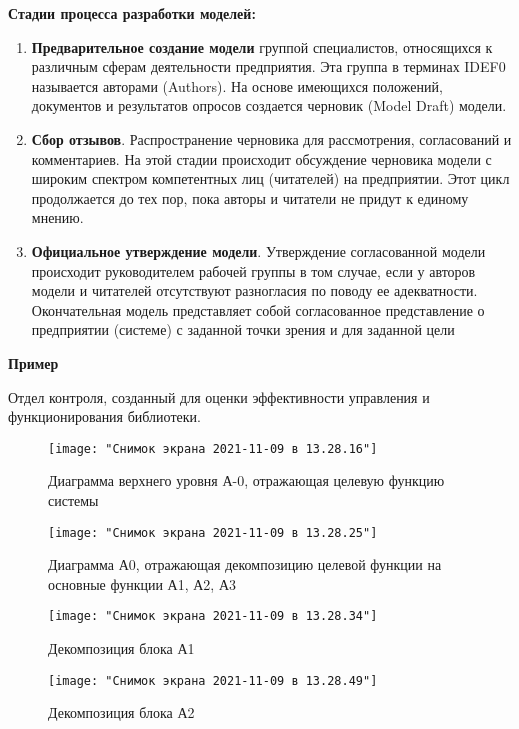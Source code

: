 \documentclass[a4paper]{article}
\begin{document}
	\textbf{Стадии процесса разработки моделей:}
	\begin{enumerate}
		\item \textbf{Предварительное создание модели} группой специалистов, относящихся к различным сферам деятельности предприятия. Эта группа в терминах IDEF0 называется авторами (Authors). На основе имеющихся положений, документов и результатов опросов создается черновик (Model Draft) модели. 
		\item \textbf{Сбор отзывов}. Распространение черновика для рассмотрения, согласований и комментариев. На этой стадии происходит обсуждение черновика модели с широким спектром компетентных лиц (читателей) на предприятии. Этот цикл продолжается до тех пор, пока авторы и читатели не придут к единому мнению.
		\item \textbf{Официальное утверждение модели}. Утверждение согласованной модели происходит руководителем рабочей группы в том случае, если у авторов модели и читателей отсутствуют разногласия по поводу ее адекватности. Окончательная модель представляет собой согласованное представление о предприятии (системе) с заданной точки зрения и для заданной цели
	\end{enumerate}

	\textbf{Пример}
	
	Отдел контроля, созданный для оценки эффективности управления и функционирования библиотеки.
	
	\begin{figure}[h!]
		\centering
		\texttt{[image: "Снимок экрана 2021-11-09 в 13.28.16"]}
		\caption{Диаграмма верхнего уровня А-0, отражающая целевую функцию системы}
		\label{fig:--2021-11-09--13}
	\end{figure}
	
	\begin{figure}[h!]
		\centering
		\texttt{[image: "Снимок экрана 2021-11-09 в 13.28.25"]}
		\caption{Диаграмма А0, отражающая декомпозицию целевой функции на основные функции А1, А2, А3}
		\label{fig:--2021-11-09--13}
	\end{figure}
	
	\begin{figure}[h!]
		\centering
		\texttt{[image: "Снимок экрана 2021-11-09 в 13.28.34"]}
		\caption{Декомпозиция блока А1}
		\label{fig:--2021-11-09--13}
	\end{figure}

	\begin{figure}[h!]
		\centering
		\texttt{[image: "Снимок экрана 2021-11-09 в 13.28.49"]}
		\caption{Декомпозиция блока А2}
		\label{fig:--2021-11-09--13}
	\end{figure}
	
\end{document}
